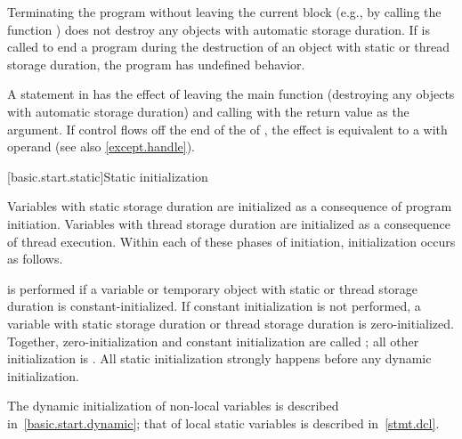 \pnum
{}%
%
%
Terminating the program
without leaving the current block (e.g., by calling the function
) does not destroy any
objects with automatic storage duration. If
 is called to end a program during the destruction of
an object with static or thread storage duration, the program has undefined
behavior.

\pnum
{}%
%
A  statement in  has the effect of leaving the main
function (destroying any objects with automatic storage duration) and
calling  with the return value as the argument.
If control flows off the end of
the  of ,
the effect is equivalent to a  with operand 
(see also \ref{except.handle}).

[basic.start.static]{Static initialization}

\pnum
{}%
%
Variables with static storage duration
are initialized as a consequence of program initiation. Variables with
thread storage duration are initialized as a consequence of thread execution.
Within each of these phases of initiation, initialization occurs as follows.

\pnum
{}%
%
 is performed
if a variable or temporary object with static or thread storage duration
is constant-initialized.
%
If constant initialization is not performed, a variable with static
storage duration or thread storage
duration is zero-initialized.
Together, zero-initialization and constant initialization are called
%
;
all other initialization is .
All static initialization strongly happens before
any dynamic initialization.
\begin{note}
The dynamic initialization of non-local variables is described
in~\ref{basic.start.dynamic}; that of local static variables is described
in~\ref{stmt.dcl}.
\end{note}

